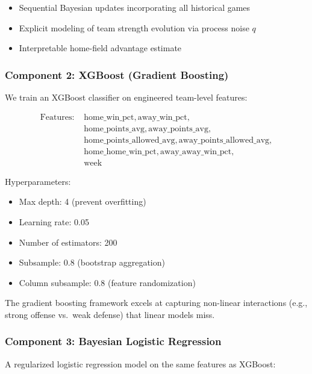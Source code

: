 \begin{itemize}
    \item Sequential Bayesian updates incorporating all historical games
    \item Explicit modeling of team strength evolution via process noise $q$
    \item Interpretable home-field advantage estimate
\end{itemize}

\subsubsection{Component 2: XGBoost (Gradient Boosting)}

We train an XGBoost classifier \citep{chen2016xgboost} on engineered team-level features:

\begin{align*}
\text{Features: } & \text{home\_win\_pct}, \text{away\_win\_pct}, \\
                   & \text{home\_points\_avg}, \text{away\_points\_avg}, \\
                   & \text{home\_points\_allowed\_avg}, \text{away\_points\_allowed\_avg}, \\
                   & \text{home\_home\_win\_pct}, \text{away\_away\_win\_pct}, \\
                   & \text{week}
\end{align*}

Hyperparameters:
\begin{itemize}
    \item Max depth: 4 (prevent overfitting)
    \item Learning rate: 0.05
    \item Number of estimators: 200
    \item Subsample: 0.8 (bootstrap aggregation)
    \item Column subsample: 0.8 (feature randomization)
\end{itemize}

The gradient boosting framework excels at capturing non-linear interactions (e.g., strong offense vs.\ weak defense) that linear models miss.

\subsubsection{Component 3: Bayesian Logistic Regression}

A regularized logistic regression model on the same features as XGBoost:

